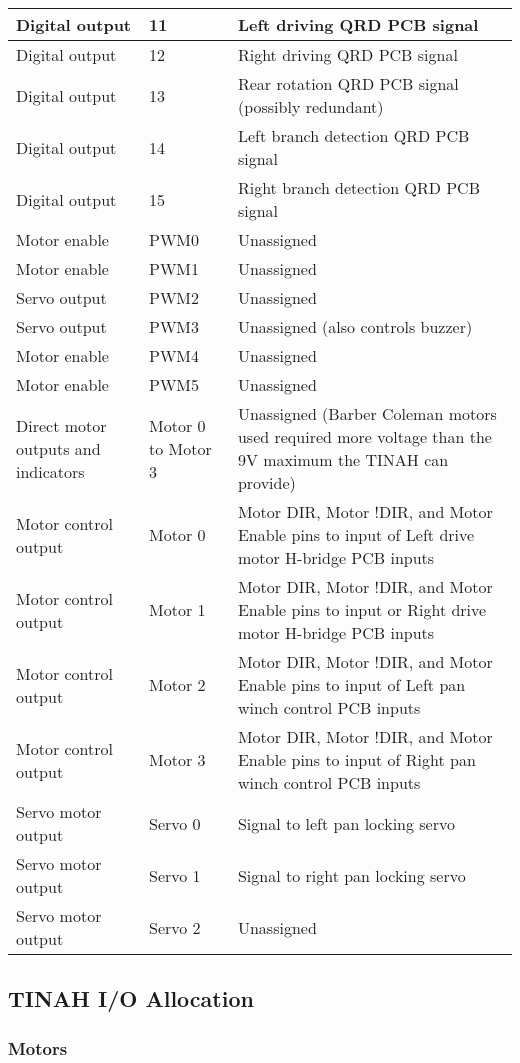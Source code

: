 \documentclass[12pt]{article}
\begin{document}
\begin{longtable}{| m{7em} | m{3em} | m{25em} |}
\hline
Digital output & 11 & Left driving QRD PCB signal \\
\hline
Digital output & 12 & Right driving QRD PCB signal \\
\hline
Digital output & 13 & Rear rotation QRD PCB signal (possibly redundant) \\
\hline
Digital output & 14 & Left branch detection QRD PCB signal \\
\hline
Digital output & 15 & Right branch detection QRD PCB signal \\
\hline
Motor enable & PWM0 & Unassigned \\
\hline
Motor enable & PWM1 & Unassigned \\
\hline
Servo output & PWM2 & Unassigned \\
\hline
Servo output & PWM3 & Unassigned (also controls buzzer) \\
\hline
Motor enable & PWM4 & Unassigned \\
\hline
Motor enable & PWM5 & Unassigned \\
\hline
Direct motor outputs and indicators & Motor 0 to Motor 3 & Unassigned (Barber Coleman motors used required more voltage than the 9V maximum the TINAH can provide) \\
\hline
Motor control output & Motor 0 & Motor DIR, Motor !DIR, and Motor Enable pins to input of Left drive motor H-bridge PCB inputs \\
\hline
Motor control output & Motor 1 & Motor DIR, Motor !DIR, and Motor Enable pins to input or Right drive motor H-bridge PCB inputs \\
\hline
Motor control output & Motor 2 & Motor DIR, Motor !DIR, and Motor Enable pins to input of Left pan winch control PCB inputs \\
\hline
Motor control output & Motor 3 & Motor DIR, Motor !DIR, and Motor Enable pins to input of Right pan winch control PCB inputs \\
\hline
Servo motor output & Servo 0 & Signal to left pan locking servo \\
\hline
Servo motor output & Servo 1 & Signal to right pan locking servo \\
\hline
Servo motor output & Servo 2 & Unassigned \\
\hline
\end{longtable}
\subsection{TINAH I/O Allocation}
\subsubsection{Motors}
\end{document}
